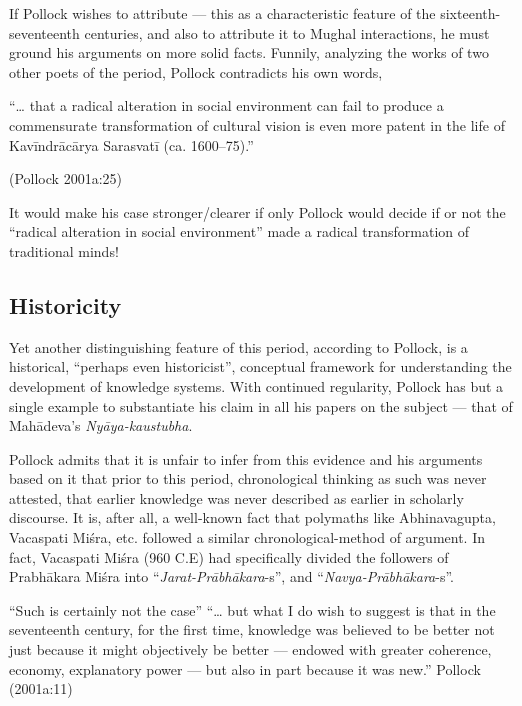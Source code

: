 If Pollock wishes to attribute — this as a characteristic feature of the sixteenth-seventeenth centuries, and also to attribute it to Mughal interactions, he must ground his arguments on more solid facts. Funnily, analyzing the works of two other poets of the period, Pollock contradicts his own words,

\newpage

 “… that a radical alteration in social environment can fail to produce a commensurate transformation of cultural vision is even more patent in the life of Kavīndrācārya Sarasvatī (ca. 1600–75).” 

\hfill (Pollock 2001a:25)

It would make his case stronger/clearer if only Pollock would decide if or not the “radical alteration in social environment” made a radical transformation of traditional minds! 

\subsection{Historicity}%

Yet another distinguishing feature of this period, according to Pollock, is a historical, “perhaps even historicist”, conceptual framework for understanding the development of knowledge systems. With continued regularity, Pollock has but a single example to substantiate his claim in all his papers on the subject — that of Mahādeva’s {\sl Nyāya-kaustubha}. 

Pollock admits that it is unfair to infer from this evidence and his arguments based on it that prior to this period, chronological thinking as such was never attested, that earlier knowledge was never described as earlier in scholarly discourse. It is, after all, a well-known fact that polymaths like Abhinavagupta, Vacaspati Miśra, etc. followed a similar chronological-method of argument. In fact, Vacaspati Miśra (960 C.E) had specifically divided the followers of Prabhākara Miśra into “{\sl Jarat-Prābhākara}-s”, and “{\sl Navya-Prābhākara}-s”.  

\begin{myquote}
“Such is certainly not the case”  “… but what I do wish to suggest is that in the seventeenth century, for the first time, knowledge was believed to be better not just because it might objectively be better — endowed with greater coherence, economy, explanatory power — but also in part because it was new.”  \hfill{Pollock (2001a:11)}
\end{myquote}

